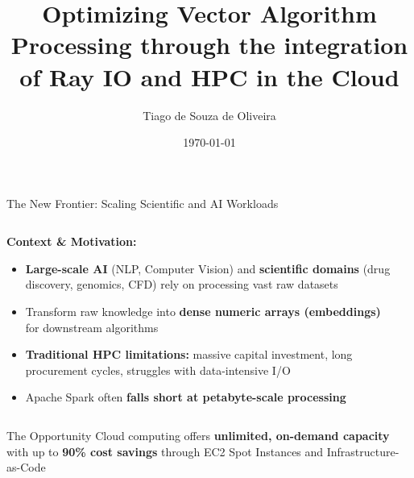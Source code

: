 \documentclass[aspectratio=169]{beamer}
\title[Optimizing Vector Algorithm Processing]{Optimizing Vector Algorithm Processing through the integration of Ray IO and HPC in the Cloud}
\author{Tiago de Souza de Oliveira}
\institute[University]{
    Master's Thesis Defense \\
    Computer Science Department
}
\date{\today}
\begin{document}
\frame{\titlepage}

\begin{frame}{The New Frontier: Scaling Scientific and AI Workloads}
    \begin{columns}
        \begin{column}{0.6\textwidth}
            \textbf{Context \& Motivation:}
            \begin{itemize}
                \item \textbf{Large-scale AI} (NLP, Computer Vision) and \textbf{scientific domains} (drug discovery, genomics, CFD) rely on processing vast raw datasets
                \item Transform raw knowledge into \textcolor{rayblue}{\textbf{dense numeric arrays (embeddings)}} for downstream algorithms
                \item \textbf{Traditional HPC limitations:} massive capital investment, long procurement cycles, struggles with data-intensive I/O
                \item Apache Spark often \textbf{falls short at petabyte-scale processing}
            \end{itemize}
        \end{column}
        \begin{column}{0.4\textwidth}
        \end{column}
    \end{columns}
    
    \vspace{0.3cm}
    \begin{alertblock}{The Opportunity}
        Cloud computing offers \textbf{unlimited, on-demand capacity} with up to \textcolor{awsorange}{\textbf{90\% cost savings}} through EC2 Spot Instances and Infrastructure-as-Code
    \end{alertblock}
\end{frame}
\end{document}
